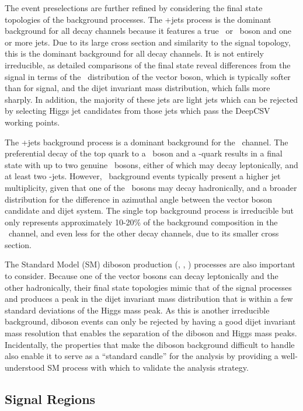 The event preselections are further refined by considering the final state topologies of the background processes. The \bosV+jets process is the dominant background for all decay channels because it features a true \bosW\ or \bosZ\ boson and one or more jets. Due to its large cross section and similarity to the signal topology, this is the dominant background for all decay channels. It is not entirely irreducible, as detailed comparisons of the final state reveal differences from the signal in terms of the \pT\ distribution of the vector boson, which is typically softer than for signal, and the dijet invariant mass distribution, which falls more sharply. In addition, the majority of these jets are light jets which can be rejected by selecting Higgs jet candidates from those jets which pass the DeepCSV working points.

The \qrkt\qrktbar+jets background process is a dominant background for the \WlnH\ channel. The preferential decay of the top quark to a \bosW\ boson and a \qrkb-quark results in a final state with up to two genuine \bosW\ bosons, either of which may decay leptonically, and at least two \qrkb-jets. However, \qrkt\qrktbar\ background events typically present a higher jet multiplicity, given that one of the \bosW\ bosons may decay hadronically, and a broader distribution for the difference in azimuthal angle between the vector boson candidate and dijet system. The single top background process is irreducible but only represents approximately 10-20\% of the background composition in the \WlnH\ channel, and even less for the other decay channels, due to its smaller cross section.

The Standard Model (SM) diboson production (\bosW\bosW, \bosW\bosZ, \bosZ\bosZ) processes are also important to consider. Because one of the vector bosons can decay leptonically and the other hadronically, their final state topologies mimic that of the signal processes and produces a peak in the dijet invariant mass distribution that is within a few standard deviations of the Higgs mass peak. As this is another irreducible background, diboson events can only be rejected by having a good dijet invariant mass resolution that enables the separation of the diboson and Higgs mass peaks. Incidentally, the properties that make the diboson background difficult to handle also enable it to serve as a ``standard candle'' for the analysis by providing a well-understood SM process with which to validate the analysis strategy.

\subsection{Signal Regions}

